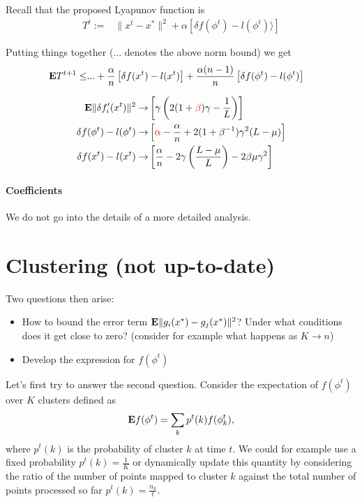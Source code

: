 \documentclass{article}
\newcommand{\E}{{\bf E}}
\newcommand{\highlight}[1]{\textcolor{red}{#1}}
\begin{document}
Recall that the proposed Lyapunov function is
\begin{align}
T^{t} := & \| x^{t} - x^*\|^2 + \alpha \left[ \delta f(\phi^{t}) -  l(\phi^{t})  \rangle \right] 
\end{align}

Putting things together ($...$ denotes the above norm bound) we get 
\begin{align}
\E T^{t+1} \leq &... + \frac {\alpha} n \left[ \delta f(x^t) - l(x^t) \right] +  \frac{\alpha(n-1)}{n} \left[ \delta f(\phi^t) -  l(\phi^t) \right] 
\end{align}

\begin{align}
\E \| \delta f'_i(x^t) \|^2 \to & \left[ \gamma \left(2(1+\highlight{\beta}) \gamma - \frac 1L \right)  \right]  \\
\delta f(\phi^t) - l(\phi^t) \to & \left[ \highlight{\alpha} - \frac{\alpha}{n} + 2(1+\beta^{-1}) \gamma^2 (L - \mu) \right] 
\\
\delta f(x^t)  - l(x^t) 
\to & \left[ \frac \alpha n- 2\gamma \left( \frac{L -\mu}{L} \right)- 2 \beta \mu \gamma^2  \right] 
\end{align}


\paragraph*{Coefficients}

We do not go into the details of a more detailed analysis. 

\newpage
\section{Clustering (not up-to-date)}

Two questions then arise:
\begin{itemize}
\item How to bound the error term $\E \| g_i(x^*) - g_j(x^*)\|^2$? Under what conditions does it get close to zero? (consider for example what happens as $K \rightarrow n$)
\item Develop the expression for $f(\phi^t)$
\end{itemize}

Let's first try to answer the second question. Consider the
expectation of $f(\phi^t)$ over $K$ clusters defined as
$$
\E f(\phi^t) = \sum_k p^t(k) f(\phi^t_k),
$$ where $p^t(k)$ is the probability of cluster $k$ at time $t$. We
could for example use a fixed probability $p^t(k) = \frac{1}{K}$ or
dynamically update this quantity by considering the ratio of the
number of points mapped to cluster $k$ against the total number of
points processed so far $p^t(k) = \frac{n_k}{t}$.\\
\end{document}
